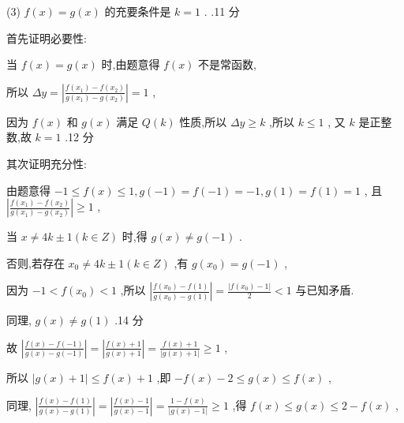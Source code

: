 \documentclass[10pt]{article}
\newcommand*\circled[1]{\tikz[baseline=(char.base)]{\node[shape=circle,draw,inner sep=1.5pt] (char) {\small #1};}}
\begin{document}
(3) \(f\left( x\right)  = g\left( x\right)\) 的充要条件是 \(k = 1\) . .11 分

首先证明必要性:

当 \(f\left( x\right)  = g\left( x\right)\) 时,由题意得 \(f\left( x\right)\) 不是常函数,

所以 \({\Delta y} = \left| \frac{f\left( {x}_{1}\right)  - f\left( {x}_{2}\right) }{g\left( {x}_{1}\right)  - g\left( {x}_{2}\right) }\right|  = 1\) ,

因为 \(f\left( x\right)\) 和 \(g\left( x\right)\) 满足 \(Q\left( k\right)\) 性质,所以 \({\Delta y} \geq  k\) ,所以 \(k \leq  1\) , 又 \(k\) 是正整数,故 \(k = 1\) .12 分

其次证明充分性:

由题意得 \(- 1 \leq  f\left( x\right)  \leq  1,g\left( {-1}\right)  = f\left( {-1}\right)  =  - 1,g\left( 1\right)  = f\left( 1\right)  = 1\) , 且 \(\left| \frac{f\left( {x}_{1}\right)  - f\left( {x}_{2}\right) }{g\left( {x}_{1}\right)  - g\left( {x}_{2}\right) }\right|  \geq  1\) ,

 \circled{1}  当 \(x \neq  {4k} \pm  1\left( {k \in  Z}\right)\) 时,得 \(g\left( x\right)  \neq  g\left( {-1}\right)\) .

否则,若存在 \({x}_{0} \neq  {4k} \pm  1\left( {k \in  Z}\right)\) ,有 \(g\left( {x}_{0}\right)  = g\left( {-1}\right)\) ,

因为 \(- 1 < f\left( {x}_{0}\right)  < 1\) ,所以 \(\left| \frac{f\left( {x}_{0}\right)  - f\left( 1\right) }{g\left( {x}_{0}\right)  - g\left( 1\right) }\right|  = \frac{\left| f\left( {x}_{0}\right)  - 1\right| }{2} < 1\) 与已知矛盾.

同理, \(g\left( x\right)  \neq  g\left( 1\right)\) .14 分

故 \(\left| \frac{f\left( x\right)  - f\left( {-1}\right) }{g\left( x\right)  - g\left( {-1}\right) }\right|  = \left| \frac{f\left( x\right)  + 1}{g\left( x\right)  + 1}\right|  = \frac{f\left( x\right)  + 1}{\left| g\left( x\right)  + 1\right| } \geq  1\) ,

所以 \(\left| {g\left( x\right)  + 1}\right|  \leq  f\left( x\right)  + 1\) ,即 \(- f\left( x\right)  - 2 \leq  g\left( x\right)  \leq  f\left( x\right)\) ,

同理, \(\left| \frac{f\left( x\right)  - f\left( 1\right) }{g\left( x\right)  - g\left( 1\right) }\right|  = \left| \frac{f\left( x\right)  - 1}{g\left( x\right)  - 1}\right|  = \frac{1 - f\left( x\right) }{\left| g\left( x\right)  - 1\right| } \geq  1\) ,得 \(f\left( x\right)  \leq  g\left( x\right)  \leq  2 - f\left( x\right)\) ,
\end{document}
